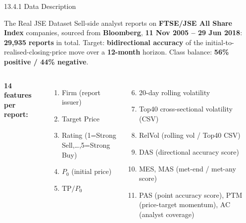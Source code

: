 \documentclass[aspectratio=169,10pt]{beamer}
\begin{document}
\begin{frame}{13.4.1 \; Data Description}
  \begin{block}{The Real JSE Dataset}
    Sell-side analyst reports on \textbf{FTSE/JSE All Share Index}
    companies, sourced from \textbf{Bloomberg}, \textbf{11 Nov 2005 -- 29 Jun
    2018}: \textbf{29{,}935 reports} in total. Target: \textbf{bidirectional
    accuracy} of the initial-to-realised-closing-price move over a
    \textbf{12-month} horizon. Class balance: \textbf{56\% positive / 44\%
    negative}.
  \end{block}
  \begin{columns}
      {\footnotesize
      \textbf{14 features per report:}
      \begin{enumerate}
        \item Firm (report issuer)
        \item Target Price
        \item Rating (1=Strong Sell,\ldots,5=Strong Buy)
        \item $P_0$ (initial price)
        \item $\mathrm{TP}/P_0$
      \end{enumerate}}
      {\footnotesize
      \begin{enumerate}
        \setcounter{enumi}{5}
        \item 20-day rolling volatility
        \item Top40 cross-sectional volatility (CSV)
        \item RelVol (rolling vol / Top40 CSV)
        \item DAS (directional accuracy score)
        \item MES, MAS (met-end / met-any score)
        \item PAS (point accuracy score), PTM (price-target momentum), AC (analyst coverage)
      \end{enumerate}}
  \end{columns}
\end{frame}
\end{document}
